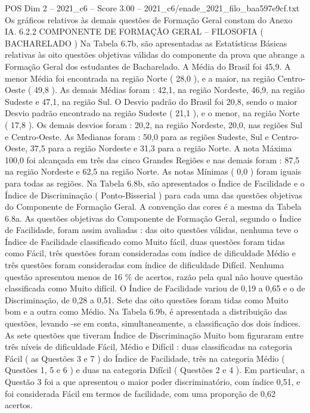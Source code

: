 \begin{textsample}{POS Dim 2 – 2021\_c6 – Score 3.00 – 2021\_c6/enade\_2021\_filo\_baa597e9cf.txt}
Os gráficos relativos às demais questões de Formação Geral constam do Anexo IA. 6.2.2 COMPONENTE DE FORMAÇÃO GERAL – FILOSOFIA ( BACHARELADO ) Na Tabela 6.7b, são apresentadas as Estatísticas Básicas relativas às oito questões objetivas válidas do componente da prova que abrange a Formação Geral dos estudantes de Bacharelado.
A Média do Brasil foi 45,9.
A menor Média foi encontrada na região Norte ( 28,0 ), e a maior, na região Centro-Oeste ( 49,8 ).
As demais Médias foram : 42,1, na região Nordeste, 46,9, na região Sudeste e 47,1, na região Sul.
O Desvio padrão do Brasil foi 20,8, sendo o maior Desvio padrão encontrado na região Sudeste ( 21,1 ), e o menor, na região Norte ( 17,8 ).
Os demais desvios foram : 20,2, na região Nordeste, 20,0, nas regiões Sul e Centro-Oeste.
As Medianas foram : 50,0 para as regiões Sudeste, Sul e Centro-Oeste, 37,5 para a região Nordeste e 31,3 para a região Norte.
A nota Máxima 100,0 foi alcançada em três das cinco Grandes Regiões e nas demais foram : 87,5 na região Nordeste e 62,5 na região Norte.
As notas Mínimas ( 0,0 ) foram iguais para todas as regiões.
Na Tabela 6.8b, são apresentados o Índice de Facilidade e o Índice de Discriminação ( Ponto-Bisserial ) para cada uma das questões objetivas do Componente de Formação Geral.
A convenção das cores é a mesma da Tabela 6.8a.
As questões objetivas do Componente de Formação Geral, segundo o Índice de Facilidade, foram assim avaliadas : das oito questões válidas, nenhuma teve o Índice de Facilidade classificado como Muito fácil, duas questões foram tidas como Fácil, três questões foram consideradas com índice de dificuldade Médio e três questões foram consideradas com índice de dificuldade Difícil.
Nenhuma questão apresentou menos de 16 \% de acertos, razão pela qual não houve questão classificada como Muito difícil.
O Índice de Facilidade variou de 0,19 a 0,65 e o de Discriminação, de 0,28 a 0,51.
Sete das oito questões foram tidas como Muito bom e a outra como Médio.
Na Tabela 6.9b, é apresentada a distribuição das questões, levando -se em conta, simultaneamente, a classificação dos dois índices.
As sete questões que tiveram Índice de Discriminação Muito bom figuraram entre três níveis de dificuldade Fácil, Médio e Difícil : duas classificadas na categoria Fácil ( as Questões 3 e 7 ) do Índice de Facilidade, três na categoria Médio ( Questões 1, 5 e 6 ) e duas na categoria Difícil ( Questões 2 e 4 ).
Em particular, a Questão 3 foi a que apresentou o maior poder discriminatório, com índice 0,51, e foi considerada Fácil em termos de facilidade, com uma proporção de 0,62 acertos.

\end{textsample}
